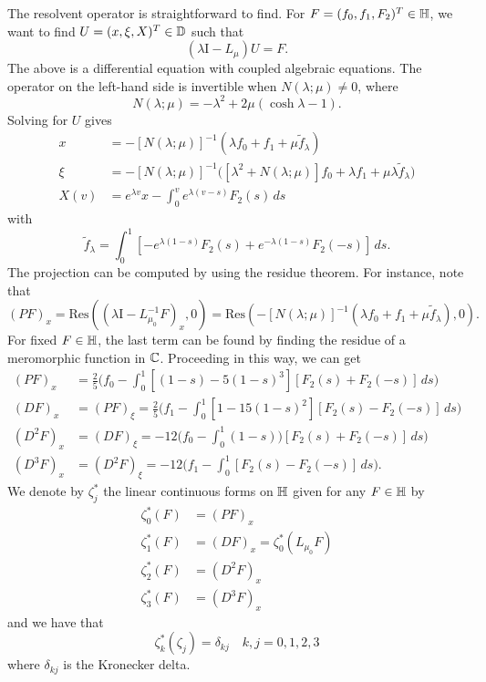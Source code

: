 The resolvent operator is straightforward to find. For \(F=(f_0,f_1,F_2)^T\in\mathbb{H}\), we want to find \(U = (x,\xi, X)^T\in \mathbb{D}\) such that
\begin{equation}
	(\lambda\mathrm I - L_\mu) U = F.
\end{equation}
The above is a differential equation with coupled algebraic equations. The operator on the left-hand side is invertible when \(N(\lambda ;\mu) \neq 0\), where 
\begin{equation}
	N(\lambda;\mu) = - \lambda^2 + 2\mu(\cosh \lambda - 1).
\end{equation}
Solving for \(U\) gives
\begin{align}
	x &= -[N(\lambda;\mu)]^{-1}(\lambda f_0 + f_1 + \mu\tilde f_\lambda) \\
	\xi &= -[N(\lambda;\mu)]^{-1} \Big( [\lambda^2 + N(\lambda;\mu)]f_0 + \lambda f_1 + \mu\lambda \tilde f_\lambda \Big) \\
	X(v) &= e^{\lambda v}x - \int_0^v e^{\lambda(v-s)} F_2(s)\, ds
\end{align}
with 
\begin{equation}
	\tilde f_\lambda = \int_0^1 [-e^{\lambda(1-s)} F_2(s) + e^{-\lambda (1-s)} F_2(-s)]\, ds.
\end{equation}
The projection can be computed by using the residue theorem. For instance, note that 
\begin{equation}
	(PF)_x = \mathrm{Res}((\lambda \mathrm I - L_{\mu_0} ^{-1} F)_x, 0) = \mathrm{Res}(-[N(\lambda;\mu)]^{-1}(\lambda f_0 + f_1 + \mu\tilde f_\lambda), 0).
\end{equation}
For fixed \(F\in\mathbb{H}\), the last term can be found by finding the residue of a meromorphic function in \(\mathbb{C}\). Proceeding in this way, we can get 
\begin{align}
	(PF)_x &= \frac 2 5 \Bigg(  f_0 - \int_0^1[(1-s) - 5(1-s)^3][F_2(s) + F_2(-s)]\, ds \Bigg) \\
	(DF)_x &= (PF)_\xi = \frac 2 5 \Bigg(  f_1 - \int_0^1[1 - 15(1-s)^2][F_2(s) - F_2(-s)]\, ds \Bigg) \\
	(D^2F)_x &= (DF)_\xi = -12 \Bigg( f_0 - \int_0^1(1-s)) [F_2(s) + F_2(-s)]\, ds \Bigg) \\
	(D^3F)_x &= (D^2 F)_\xi = -12 \Bigg(f_1 - \int_0^1 [F_2(s) - F_2(-s)]\, ds \Bigg).
\end{align}
We denote by \(\zeta_j^*\) the linear continuous forms on \(\mathbb{H}\) given for any \(F\in\mathbb{H}\) by
\begin{equation}
	\begin{aligned}
		\zeta_0^*(F)&= (PF)_x \\
		\zeta_1^*(F) &= (DF)_x  = \zeta_0^*(L_{\mu_0} F) \\
		\zeta_2^*(F) &= (D^2F)_x  \\
		\zeta_3^*(F) &= (D^3F)_x 
	\end{aligned}
\end{equation}
and we have that
\begin{equation}
	\zeta_k^*(\zeta_j) = \delta_{kj} \quad k,j = 0, 1, 2, 3
\end{equation}
where \(\delta_{kj}\) is the Kronecker delta.

